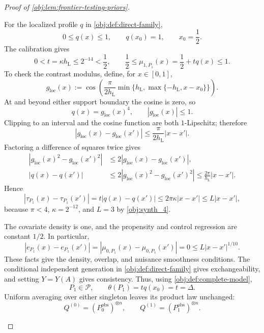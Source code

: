 \documentclass[11pt]{article}
\begin{document}
\begin{proof}[Proof of \cref{obj:lem:frontier-testing-priors}]
\begin{enumerate}
For the localized profile \(q\) in \cref{obj:def:direct-family},
\[
0\le q(x)\le1,\qquad q(x_0)=1,\qquad x_0=\frac12.
\]
The calibration gives
\[
0<t=\kappa h_{\mathrm L}\le2^{-14}<\frac12,
\qquad
\frac12\le\mu_{1,P_1}(x)=\frac12+tq(x)\le1.
\]
To check the contrast modulus, define, for \(x\in[0,1]\),
\[
g_{\mathrm{loc}}(x)
:=\cos\!\left(
\frac{\pi}{2h_{\mathrm L}}
\min\{h_{\mathrm L},\max\{-h_{\mathrm L},x-x_0\}\}
\right).
\]
At and beyond either support boundary the cosine is zero, so
\[
q(x)=g_{\mathrm{loc}}(x)^4,\qquad |g_{\mathrm{loc}}(x)|\le1.
\]
Clipping to an interval and the cosine function are both \(1\)-Lipschitz;
therefore
\[
|g_{\mathrm{loc}}(x)-g_{\mathrm{loc}}(x')|
\le\frac{\pi}{2h_{\mathrm L}}|x-x'|.
\]
Factoring a difference of squares twice gives
\[
\begin{aligned}
|g_{\mathrm{loc}}(x)^2-g_{\mathrm{loc}}(x')^2|
&\le2|g_{\mathrm{loc}}(x)-g_{\mathrm{loc}}(x')|,\\
|q(x)-q(x')|
&\le2|g_{\mathrm{loc}}(x)^2-g_{\mathrm{loc}}(x')^2|
 \le\frac{2\pi}{h_{\mathrm L}}|x-x'|.
\end{aligned}
\]
Hence
\[
|\tau_{P_1}(x)-\tau_{P_1}(x')|
=t|q(x)-q(x')|
\le2\pi\kappa|x-x'|
\le L|x-x'|,
\]
because \(\pi<4\), \(\kappa=2^{-12}\), and \(L=3\) by
\cref{obj:synth_4}.

The covariate density is one, and the propensity and control regression
are constant \(1/2\). In particular,
\[
|e_{P_1}(x)-e_{P_1}(x')|
=|\mu_{0,P_1}(x)-\mu_{0,P_1}(x')|
=0\le L|x-x'|^{1/10}.
\]
These facts give the density, overlap, and nuisance smoothness conditions.
The conditional independent generation in
\cref{obj:def:direct-family} gives exchangeability, and setting
\(Y=Y(A)\) gives consistency. Thus, using
\cref{obj:def:complete-model},
\[
P_1\in\mathcal P,\qquad
\theta(P_1)=tq(x_0)=t=\Delta.
\]
Uniform averaging over either singleton leaves its product law unchanged:
\[
Q^{(0)}=(P_0^{\mathrm{obs}})^{\otimes n},\qquad
Q^{(1)}=(P_1^{\mathrm{obs}})^{\otimes n}.
\]


\end{enumerate}
\end{proof}
\end{document}
